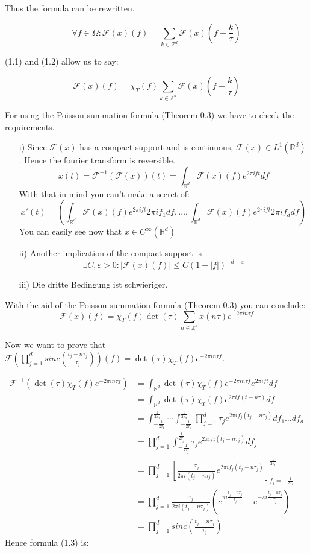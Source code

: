\documentclass[a4paper, 11pt]{scrreprt}
\newcommand{\RR}{\mathbb{R}}
\newcommand{\ZZ}{\mathbb{Z}}
\newcommand{\FF}{\mathcal{F}}
\begin{document}
Thus the formula can be rewritten.

\begin{equation}
\forall f \in \Omega: \FF(x)(f) = \sum_{k \in \ZZ^d} \FF(x)\left( f+\frac{k}{\tau}\right)
\end{equation} 

(1.1) and (1.2) allow us to say:

\[\FF(x)(f) = \chi_{T}(f) \sum_{k \in \ZZ^d} \FF(x)\left(f+\frac{k}{\tau}\right)\]

For using the Poisson summation formula (Theorem 0.3) we have to check the requirements.

\begin{itemize}
	\item[i)] Since \(\FF(x)\) has a compact support and is continuous, \(\FF(x) \in L^1(\RR^d)\). Hence the fourier transform is reversible.
	 \[x(t) = \FF^{-1}(\FF(x))(t) = \int_{\RR^d}\FF(x)(f) e^{2 \pi i f t} df\]
	 With that in mind you can't make a secret of:
	 \[x'(t) = \left(\int_{\RR^d} \FF(x)(f) e^{2 \pi i f t} 2 \pi i f_1 df, \ldots, \int_{\RR^d} \FF(x)(f) e^{2 \pi i f t} 2 \pi i f_d df \right)\]
	 You can easily see now that \(x \in C^\infty(\RR^d)\)
	 \item[ii)] Another implication of the compact support is \[\exists C,\varepsilon>0: |\FF(x)(f)| \le C (1+|f|)^{-d-\varepsilon}\]
	 \item[iii)] Die dritte Bedingung ist schwieriger.
\end{itemize}

With the aid of the Poisson summation formula (Theorem 0.3) you can conclude:
\begin{equation}
\FF(x)(f) = \chi_{T}(f) \det(\tau) \sum_{n \in \ZZ^d} x(n\tau)e^{-2\pi i n\tau f}
\end{equation}

Now we want to prove that \(\FF\left( \prod_{j=1}^d sinc \left( \frac{t_j-n\tau_j}{\tau_j}\right)\right)(f) = \det(\tau)\chi_{T}(f)e^{-2\pi in\tau f}\).

\begin{align*}
\FF^{-1}\left( \det(\tau) \chi_{T}(f) e^{-2 \pi i n \tau f}\right) 
&= \int_{\RR^d} \det(\tau) \chi_{T}(f) e^{-2 \pi i n \tau f} e^{2 \pi i f t} df \\
&= \int_{\RR^d} \det(\tau) \chi_{T}(f) e^{2 \pi i f (t-n\tau) }df \\
&= \int_{-\frac{1}{2\tau_1}}^{\frac{1}{2\tau_1}} \cdots \int_{-\frac{1}{2\tau_d}}^{\frac{1}{2\tau_d}} \prod_{j=1}^d \tau_j e^{2 \pi i f_j(t_j-n \tau_j)}df_1 \ldots df_d \\
&= \prod_{j=1}^d \int_{-\frac{1}{2\tau_j}}^{\frac{1}{2\tau_j}} \tau_j e^{2 \pi i f_j (t_j - n \tau_j)}df_j \\
&= \prod_{j=1}^d \left[  \frac{\tau_j}{2 \pi i (t_j - n \tau_j)} e^{2 \pi i f_j (t_j - n \tau_j)} \right]_{f_j = -\frac{1}{2\tau_1}}^{\frac{1}{2\tau_1}} \\
&= \prod_{j=1}^d \frac{\tau_j}{2 \pi i (t_j - n \tau_j)} \left( e^{\pi i \frac{t_j - n \tau_j}{\tau_j}} - e^{-\pi i \frac{t_j - n \tau_j}{\tau_j}} \right) \\
&= \prod_{j=1}^d sinc \left( \frac{t_j - n \tau_j}{\tau_j} \right)
\end{align*}
Hence formula (1.3) is:
\end{document}

